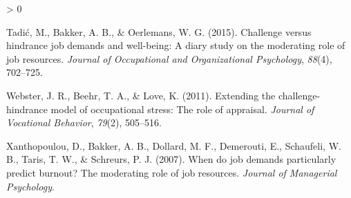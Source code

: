 \documentclass[
  english,
  man]{apa6}
\newlength{\cslhangindent}
\newenvironment{CSLReferences}[2] %
 {%
  \setlength{\parindent}{0pt}
  \ifodd #1 \everypar{\setlength{\hangindent}{\cslhangindent}}\ignorespaces\fi
  \ifnum #2 > 0
  \setlength{\parskip}{#2\baselineskip}
  \fi
 }%
 {}
\begin{document}
\begin{CSLReferences}{1}{0}
\leavevmode\hypertarget{ref-tadic2015challenge}{}%
Tadić, M., Bakker, A. B., \& Oerlemans, W. G. (2015). Challenge versus hindrance job demands and well-being: A diary study on the moderating role of job resources. \emph{Journal of Occupational and Organizational Psychology}, \emph{88}(4), 702--725.

\leavevmode\hypertarget{ref-webster2011extending}{}%
Webster, J. R., Beehr, T. A., \& Love, K. (2011). Extending the challenge-hindrance model of occupational stress: The role of appraisal. \emph{Journal of Vocational Behavior}, \emph{79}(2), 505--516.

\leavevmode\hypertarget{ref-xanthopoulou2007job}{}%
Xanthopoulou, D., Bakker, A. B., Dollard, M. F., Demerouti, E., Schaufeli, W. B., Taris, T. W., \& Schreurs, P. J. (2007). When do job demands particularly predict burnout? The moderating role of job resources. \emph{Journal of Managerial Psychology}.

\end{CSLReferences}

\endgroup
\end{document}

